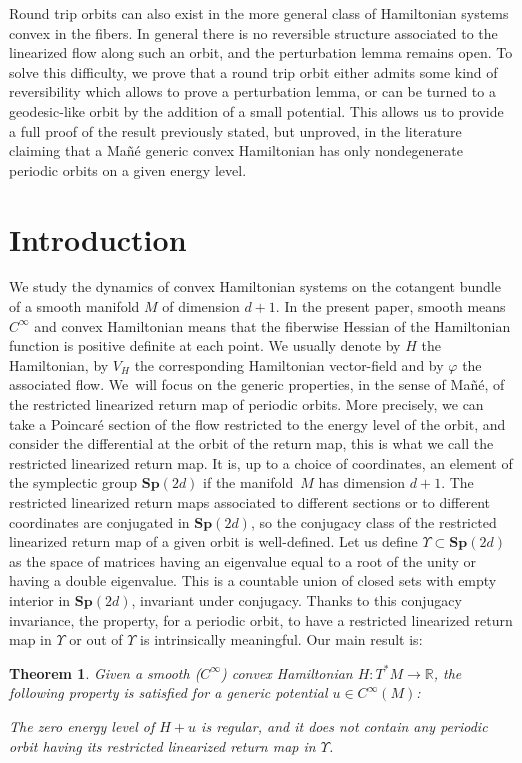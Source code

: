 \documentclass[JEP,XML,SOM,Unicode,published]{cedram}
\newcommand{\Rm}{\mathbb{R}}
\newcommand{\Sp}{\mathbf{Sp}}
\theoremstyle{plain}
\newtheorem{thm}{Theorem}
\theoremstyle{definition}
\begin{document}
Round trip orbits can also exist in the more general class of
Hamiltonian systems convex in the fibers. In general there is no reversible structure associated to the linearized flow along such an orbit, and the perturbation lemma remains open.
To solve this difficulty, we prove that a round trip orbit either admits some kind of reversibility which allows to prove a perturbation lemma, or can be turned to a geodesic-like orbit by the addition of a small potential.
This allows us to provide a full proof of the result previously stated, but unproved, in the literature claiming that a Mañé generic convex Hamiltonian has only nondegenerate periodic orbits on a given energy level.

\section{Introduction}

We study the dynamics of convex Hamiltonian systems on the cotangent bundle of a smooth manifold $M$ of dimension $d+1$.
In the present paper, smooth means $C^{\infty}$ and convex Hamiltonian means that the fiberwise Hessian
of the Hamiltonian function is positive definite at each point.
We usually denote by $H$ the Hamiltonian, by $V_H$ the corresponding Hamiltonian vector-field and by $\varphi$ the associated flow. We~will focus on the generic properties, in the sense of Mañé, of the restricted linearized return map of periodic orbits.
More precisely, we can take a Poincaré section
of the flow restricted to the energy level of the orbit, and consider the differential at the orbit of the return map, this is what we call the restricted linearized return map.
It is, up to a choice of coordinates, an element of the symplectic group $\Sp(2d)$ if
the manifold~$M$ has dimension $d+1$.
The restricted linearized return maps associated to different sections or to different coordinates are conjugated in $\Sp(2d)$, so the conjugacy class of the restricted linearized return map of a given orbit is well-defined.
Let us define $\Upsilon \subset \Sp(2d)$ as the space of matrices having an eigenvalue equal to a root of the unity or having a double eigenvalue. This is a countable union of closed sets with empty interior in $\Sp(2d)$, invariant under conjugacy.
Thanks to this conjugacy invariance, the property, for a periodic orbit, to have a restricted linearized return map in
$\Upsilon$ or out of $\Upsilon$ is intrinsically meaningful.
Our main result is:

\begin{thm}\label{thm-g1}
Given a smooth ($C^{\infty}$) convex Hamiltonian $H: T^*M\rightarrow \Rm$,
the following property is satisfied for a generic potential $u\in C^{\infty}(M)$:

The zero energy level of $H+u$ is regular, and it does not contain any periodic orbit having its restricted linearized return map in $\Upsilon$.
\end{thm}
\end{document}
